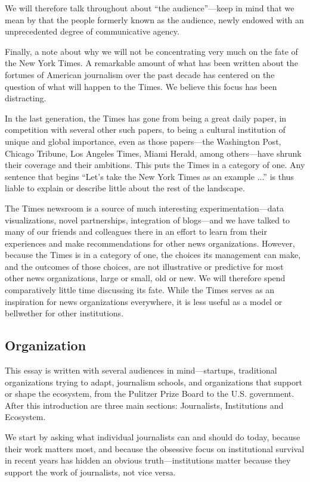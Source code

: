 We will therefore talk throughout about ``the audience''—keep in mind that we
mean by that the people formerly known as the audience, newly endowed with
an unprecedented degree of communicative agency.

Finally, a note about why we will not be concentrating very much on the fate of
the New York Times. A remarkable amount of what has been written about the
fortunes of American journalism over the past decade has centered on the question
of what will happen to the Times. We believe this focus has been distracting.

In the last generation, the Times has gone from being a great daily paper, in
competition with several other such papers, to being a cultural institution of
unique and global importance, even as those papers—the Washington Post, Chicago
Tribune, Los Angeles Times, Miami Herald, among others—have shrunk their coverage and their ambitions. This puts the Times in a category of one. Any
sentence that begins ``Let’s take the New York Times as an example ...'' is thus
liable to explain or describe little about the rest of the landscape.

The Times newsroom is a source of much interesting experimentation—data
visualizations, novel partnerships, integration of blogs—and we have talked to
many of our friends and colleagues there in an effort to learn from their experiences
and make recommendations for other news organizations. However,
because the Times is in a category of one, the choices its management can make,
and the outcomes of those choices, are not illustrative or predictive for most
other news organizations, large or small, old or new. We will therefore spend
comparatively little time discussing its fate. While the Times serves as an inspiration
for news organizations everywhere, it is less useful as a model or bellwether
for other institutions.

\subsection{Organization}

This essay is written with several audiences in mind—startups, traditional organizations
trying to adapt, journalism schools, and organizations that support or
shape the ecosystem, from the Pulitzer Prize Board to the U.S. government.
After this introduction are three main sections: Journalists, Institutions
and Ecosystem.

We start by asking what individual journalists can and should do today, because
their work matters most, and because the obsessive focus on institutional survival
in recent years has hidden an obvious truth—institutions matter because they
support the work of journalists, not vice versa.

